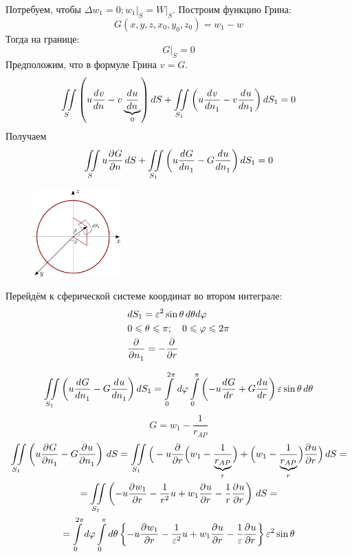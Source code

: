 Потребуем, чтобы $\Delta w_1 = 0; w_1 \big|_S = W\big|_S$. Построим функцию Грина:
\[
	G(x, y, z, x_0, y_0, z_0) = w_1 - w
\]
Тогда на границе: 
\[
	G\big|_S = 0
\]
Предположим, что в формуле Грина $v = G$.
\[
	\iint\limits_S \left(u \frac{d^{}v}{dn^{}} - v \underbrace{\frac{d^{}u}{dn^{}}}_0\right) dS + \iint\limits_{S_1} \left(u \frac{d^{}v}{dn_1^{}} - v \frac{d^{}u}{dn_1^{}}\right) dS_1 = 0
\]
Получаем 
\[
	\iint\limits_S u \frac{\partial^{}G}{\partial n^{}}\, dS + \iint\limits_{S_1} \left(u \frac{d^{}G}{dn_1^{}} - G \frac{d^{}u}{dn_1^{}}\right) dS_1 = 0
\]

\begin{figure}
	\centering
	\includegraphics[width = 0.3\textwidth]{figGreenIllust.pdf}
\end{figure}
Перейдём к сферической системе координат во втором интеграле:
\begin{align*}
	&dS_1 = \varepsilon^2 \sin \theta\, d \theta d \varphi\\
	&0 \leqslant \theta \leqslant \pi; \quad 0 \leqslant \varphi \leqslant 2\pi\\
	&\frac{\partial^{}}{\partial n_1^{}} = - \frac{\partial^{}}{\partial r^{}}
\end{align*}

\[
	 \iint\limits_{S_1} \left(u \frac{d^{}G}{dn_1^{}} - G \frac{d^{}u}{dn_1^{}}\right) dS_1 = \int\limits_0^{2 \pi}\, d\varphi \int\limits_0^{\pi} \left(- u \frac{d^{}G}{dr^{}} + G \frac{d^{}u}{dr^{}} \right) \varepsilon \sin \theta\, d\theta
\]
\[
	G = w_1 - \frac{1}{r_{AP}}
\]
\begin{multline*}
	\iint\limits_{S_1} \left(u \frac{\partial^{}G}{\partial n_1^{}} - G \frac{\partial^{}u}{\partial n_1^{}} \right)\, dS = \iint\limits_{S_1} \Big(- u \frac{\partial^{}}{\partial r^{}} \Big(w_1 - \frac{1}{\underbrace{r_{AP}}_r} \Big) + \Big(w_1 - \frac{1}{\underbrace{r_{AP}}_r} \Big) \frac{\partial^{}u}{\partial r^{}} \Big)\, dS =\\
	= \iint\limits_{S_1} \left(- u \frac{\partial^{}w_1}{\partial r^{}} - \frac{1}{r^2} u + w_1 \frac{\partial^{}u}{\partial r^{}} - \frac{1}{r} \frac{\partial^{}u}{\partial r^{}}\right)\, dS = \\
	= \int\limits_0^{2 \pi}d \varphi \int\limits_0^\pi d \theta \left\{ - u \frac{\partial^{}w_1}{\partial r^{}} - \frac{1}{\varepsilon^2} u + w_1 \frac{\partial^{}u}{\partial r^{}} - \frac{1}{\varepsilon} \frac{\partial^{}u}{\partial r^{}} \right\} \varepsilon^2 \sin \theta
\end{multline*}

